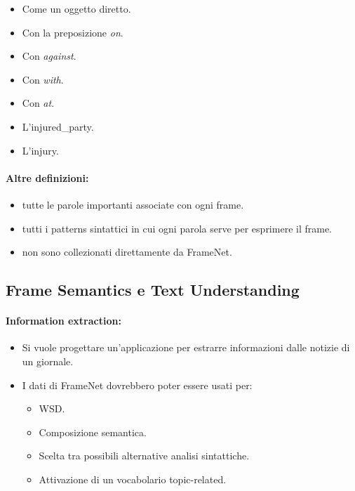 
\begin{itemize}
  \item Come un oggetto diretto. 
  \item Con la preposizione \textit{on}. 
  \item Con \textit{against}. 
  \item Con \textit{with}. 
  \item Con \textit{at}.
\end{itemize}


\begin{itemize}
  \item L'injured\_party. 
  \item L'injury.
\end{itemize}

\paragraph{Altre definizioni:}

\begin{itemize}
  \item {} tutte le parole importanti associate con ogni frame. 
  \item {} tutti i patterns sintattici in cui ogni parola serve per esprimere il frame.  
  \item {} non sono collezionati direttamente da FrameNet.
\end{itemize}

\subsection{Frame Semantics e Text Understanding}

\paragraph{Information extraction:}

\begin{itemize}
  \item Si vuole progettare un'applicazione per estrarre informazioni dalle notizie di un giornale. 
  \item I dati di FrameNet dovrebbero poter essere usati per: 
    \begin{itemize}
      \item WSD. 
      \item Composizione semantica. 
      \item Scelta tra possibili alternative analisi sintattiche. 
      \item Attivazione di un vocabolario topic-related. 
    \end{itemize}
\end{itemize}

